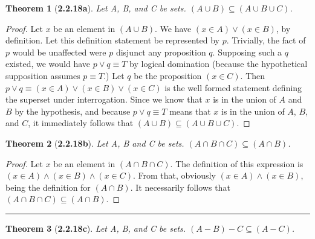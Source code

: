 \documentclass[a4paper, 12pt]{article}
\theoremstyle{plain}
\newtheorem*{theorem*}{Theorem}
\begin{document}
\begin{theorem*}[\textbf{2.2.18a}]
    Let A, B, and C be sets. $(A \cup B) \subseteq (A \cup B \cup C)$.
\end{theorem*}

\begin{proof}
    Let $x$ be an element in $(A \cup B)$. We have $(x \in A) \lor (x \in B)$, by definition. 
    Let this definition statement be represented by $p$. Trivially, the fact of $p$ would be 
    unaffected were $p$ disjunct any proposition $q$. Supposing such a $q$ existed, we would have 
    $p \lor q \equiv T$ by logical domination (because the hypothetical supposition assumes 
    $p \equiv T$.) Let $q$ be the proposition $(x \in C)$. Then 
    $p \lor q \equiv (x \in A) \lor (x \in B) \lor (x \in C)$ is the well formed statement 
    defining the superset under interrogation. Since we know that $x$ is in the union of $A$ and 
    $B$ by the hypothesis, and because $p \lor q \equiv T$ means that $x$ is in the union of 
    $A$, $B$, and $C$, it immediately follows that \newline $(A \cup B) \subseteq (A \cup B \cup C)$.
\end{proof}

\pagebreak


\begin{theorem*}[\textbf{2.2.18b}]
    Let A, B and C be sets. $(A \cap B \cap C) \subseteq (A \cap B)$.
\end{theorem*}

\begin{proof}
    Let $x$ be an element in $(A \cap B \cap C)$. The definition of this expression is 
    $(x \in A) \land (x \in B) \land (x \in C)$. From that, obviously 
    $(x \in A) \land (x \in B)$, being the definition for $(A \cap B)$. It necessarily 
    follows that $(A \cap B \cap C) \subseteq (A \cap B)$.
\end{proof}
\begin{center}
    \rule{5.4in}{1pt}
\end{center}


\begin{theorem*}[\textbf{2.2.18c}]
    Let A, B, and C be sets. $(A - B) - C \subseteq (A - C)$.
\end{theorem*}
\end{document}

